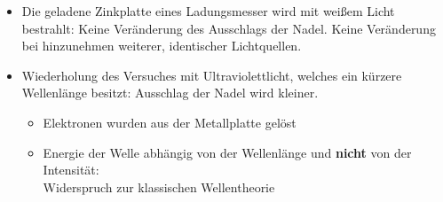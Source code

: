 \begin{itemize}
\item Die geladene Zinkplatte eines Ladungsmesser wird mit weißem Licht bestrahlt: Keine Veränderung des Ausschlags der Nadel. Keine Veränderung bei hinzunehmen weiterer, identischer Lichtquellen.
\item Wiederholung des Versuches mit Ultraviolettlicht, welches ein kürzere Wellenlänge besitzt: Ausschlag der Nadel wird kleiner.
\begin{itemize}
	\item Elektronen wurden aus der Metallplatte gelöst
	\item Energie der Welle abhängig von der Wellenlänge und \textbf{nicht} von der Intensität:\\ Widerspruch zur klassischen Wellentheorie
\end{itemize}
\end{itemize}